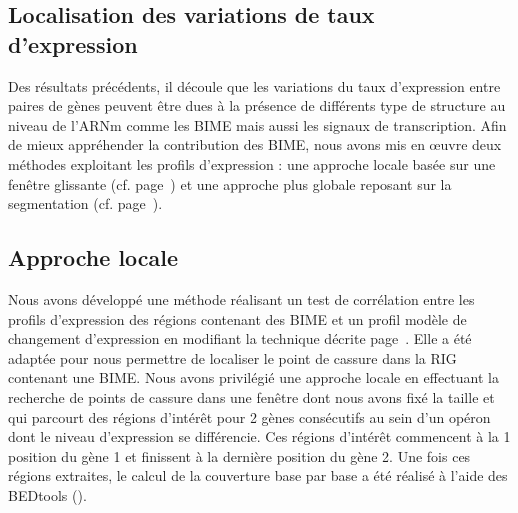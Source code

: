 \documentclass[12pt,a4paper]{report}
\begin{document}
\begin{onehalfspace}
\section*{Localisation des variations de taux d'expression}

Des résultats précédents, il découle que les variations du taux d’expression entre paires de gènes peuvent être dues à la présence de différents type de structure au niveau de l’ARNm comme les BIME mais aussi les signaux de transcription. Afin de mieux appréhender la contribution des BIME, nous avons mis en œuvre deux méthodes exploitant les profils d’expression : une approche locale basée sur une fenêtre glissante (cf. page~\pageref{methode_correlation}) et une approche plus globale reposant sur la segmentation (cf. page~\pageref{methode_segmentation}). 

\subsection*{Approche locale}
\label{approche_locale}

Nous avons développé une méthode réalisant un test de corrélation entre les profils d'expression des régions contenant des BIME et un profil modèle de changement d'expression en modifiant la technique décrite page~\pageref{methode_correlation}. Elle a été adaptée pour nous permettre de localiser le point de cassure dans la RIG contenant une BIME. Nous avons privilégié une approche locale en effectuant la recherche de points de cassure dans une fenêtre dont nous avons fixé la taille et qui parcourt des régions d'intérêt pour 2 gènes consécutifs au sein d'un opéron dont le niveau d'expression se différencie. Ces régions d'intérêt commencent à la 1 position du gène 1 et finissent à la dernière position du gène 2. Une fois ces régions extraites, le calcul de la couverture base par base a été réalisé à l'aide des BEDtools ().


\end{onehalfspace}
\end{document}
